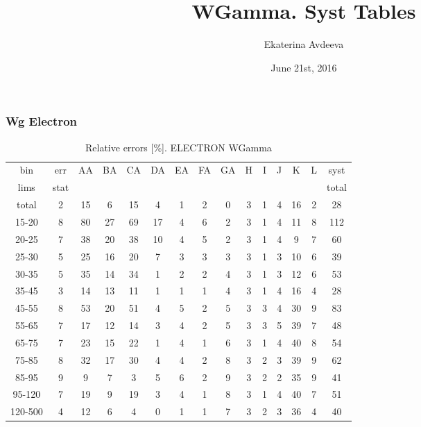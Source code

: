 \documentclass{beamer}
\title{WGamma. Syst Tables}
\author{Ekaterina Avdeeva}
\institute{University of Nebraska - Lincoln}
\date{June 21st, 2016}
\begin{document}
\begin{frame}
\titlepage
\end{frame}

\begin{frame}\frametitle{Wg Electron}
\begin{table}[h]
  \scriptsize
  \begin{center}
  \caption{Relative errors [\%]. ELECTRON WGamma}
  \begin{tabular}{|c|c|c|c|c|c|c|c|c|c|c|c|c|c|c|}
    bin  & err & AA & BA & CA & DA  & EA & FA & GA & H & I & J & K & L & syst\\
    lims  & stat &  &  &  &  &  &  &  &  &  &  &  &  & total\\ \hline
    total  & 2 & 15 & 6 & 15 & 4 & 1 & 2 & 0 & 3 & 1 & 4 & 16 & 2 & 28 \\ \hline
    15-20 & 8 & 80 & 27 & 69 & 17 & 4 & 6 & 2 & 3 & 1 & 4 & 11 & 8 & 112 \\ \hline
    20-25 & 7 & 38 & 20 & 38 & 10 & 4 & 5 & 2 & 3 & 1 & 4 & 9 & 7 & 60 \\ \hline
    25-30 & 5 & 25 & 16 & 20 & 7 & 3 & 3 & 3 & 3 & 1 & 3 & 10 & 6 & 39 \\ \hline
    30-35 & 5 & 35 & 14 & 34 & 1 & 2 & 2 & 4 & 3 & 1 & 3 & 12 & 6 & 53 \\ \hline
    35-45 & 3 & 14 & 13 & 11 & 1 & 1 & 1 & 4 & 3 & 1 & 4 & 16 & 4 & 28 \\ \hline
    45-55 & 8 & 53 & 20 & 51 & 4 & 5 & 2 & 5 & 3 & 3 & 4 & 30 & 9 & 83 \\ \hline
    55-65 & 7 & 17 & 12 & 14 & 3 & 4 & 2 & 5 & 3 & 3 & 5 & 39 & 7 & 48 \\ \hline
    65-75 & 7 & 23 & 15 & 22 & 1 & 4 & 1 & 6 & 3 & 1 & 4 & 40 & 8 & 54 \\ \hline
    75-85 & 8 & 32 & 17 & 30 & 4 & 4 & 2 & 8 & 3 & 2 & 3 & 39 & 9 & 62 \\ \hline
    85-95 & 9 & 9 & 7 & 3 & 5 & 6 & 2 & 9 & 3 & 2 & 2 & 35 & 9 & 41 \\ \hline
    95-120 & 7 & 19 & 9 & 19 & 3 & 4 & 1 & 8 & 3 & 1 & 4 & 40 & 7 & 51 \\ \hline
    120-500 & 4 & 12 & 6 & 4 & 0 & 1 & 1 & 7 & 3 & 2 & 3 & 36 & 4 & 40 \\ \hline
  \end{tabular}
  \label{tab:systInPercent_ELECTRON_WGamma}
  \end{center}
\end{table}

\end{frame}
\end{document}
